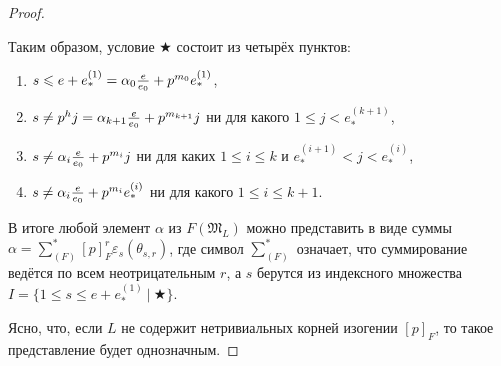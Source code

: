 \documentclass[a4paper]{article}
\newcommand{\ML}{\mathfrak{M}_L}
\newcommand{\Leq}{\leqslant}
\begin{document}
\begin{proof}
\begin{enumerate}
\end{enumerate}
Таким образом, условие $\bigstar$ состоит из четырёх пунктов:
\begin{enumerate}
\item $s\Leq e+e_*^{(1)}=\alpha_0{e\over e_0}+p^{m_0}e_*^{(1)}$,
\item $s\neq p^hj=\alpha_{k+1}{e\over e_0}+p^{m_{k+1}}j$ ни для какого $1\Leq j< e_*^{(k+1)}$,
\item $s\neq\alpha_i{e\over e_0}+p^{m_i}j$ ни для каких $1\Leq i\Leq k$ и $e_*^{(i+1)}<j<e_*^{(i)}$,
\item $s\neq\alpha_i{e\over e_0}+p^{m_i}e_*^{(i)}$ ни для какого $1\Leq i\Leq k+1$.
\end{enumerate}
В итоге любой элемент $\alpha$ из $F(\ML)$ можно представить в виде суммы $\alpha=\sum_{(F)}^*[p]_F^r\varepsilon_s(\theta_{s,r})$, где символ $\sum_{(F)}^*$ означает, что суммирование ведётся по всем неотрицательным $r$, а $s$ берутся из индексного множества $I=\{1\Leq s\Leq e+e_*^{(1)}\ |\ \bigstar\}$.

Ясно, что, если $L$ не содержит нетривиальных корней изогении $[p]_F$, то такое представление будет однозначным.
\end{proof}

\paragraph{}
\end{document}
